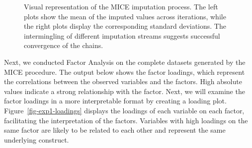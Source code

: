 \documentclass[
]{article}
\begin{document}
\begin{figure}
\begin{minipage}[t]{0.50\linewidth}
{{}

}

\subcaption{\label{fig-mice-10}}
\end{minipage}%
\newline
\begin{minipage}[t]{0.50\linewidth}

{\centering 


}

\subcaption{\label{fig-mice-11}}
\end{minipage}%
%
\begin{minipage}[t]{0.50\linewidth}

{\centering 


}

\subcaption{\label{fig-mice-12}}
\end{minipage}%
\newline
\begin{minipage}[t]{0.50\linewidth}

{\centering 


}

\subcaption{\label{fig-mice-13}}
\end{minipage}%

\caption{\label{fig-mice}Visual representation of the MICE imputation
process. The left plots show the mean of the imputed values across
iterations, while the right plots display the corresponding standard
deviations. The intermingling of different imputation streams suggests
successful convergence of the chains.}

\end{figure}

Next, we conducted Factor Analysis on the complete datasets generated by
the MICE procedure. The output below shows the factor loadings, which
represent the correlations between the observed variables and the
factors. High absolute values indicate a strong relationship with the
factor. Next, we will examine the factor loadings in a more
interpretable format by creating a loading plot.
Figure~\ref{fig-exp1-loadings} displays the loadings of each variable on
each factor, facilitating the interpretation of the factors. Variables
with high loadings on the same factor are likely to be related to each
other and represent the same underlying construct.
\end{document}
